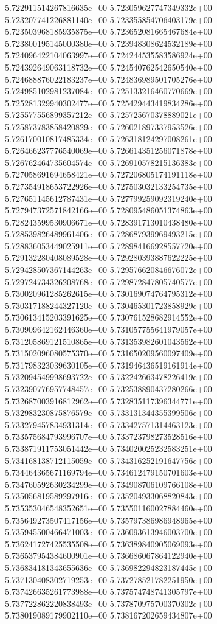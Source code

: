 5.722911514267816635e+00
5.723059627747349332e+00
5.723207741226881140e+00
5.723355854706403179e+00
5.723503968185935875e+00
5.723652081665467684e+00
5.723800195145000380e+00
5.723948308624532189e+00
5.724096422104063997e+00
5.724244535583586924e+00
5.724392649063118732e+00
5.724540762542650540e+00
5.724688876022183237e+00
5.724836989501705276e+00
5.724985102981237084e+00
5.725133216460770669e+00
5.725281329940302477e+00
5.725429443419834286e+00
5.725577556899357212e+00
5.725725670378889021e+00
5.725873783858420829e+00
5.726021897337953526e+00
5.726170010817485334e+00
5.726318124297008261e+00
5.726466237776540069e+00
5.726614351256071878e+00
5.726762464735604574e+00
5.726910578215136383e+00
5.727058691694658421e+00
5.727206805174191118e+00
5.727354918653722926e+00
5.727503032133254735e+00
5.727651145612787431e+00
5.727799259092319240e+00
5.727947372571842166e+00
5.728095486051374863e+00
5.728243599530906671e+00
5.728391713010438480e+00
5.728539826489961406e+00
5.728687939969493215e+00
5.728836053449025911e+00
5.728984166928557720e+00
5.729132280408089528e+00
5.729280393887622225e+00
5.729428507367144263e+00
5.729576620846676072e+00
5.729724734326208768e+00
5.729872847805740577e+00
5.730020961285262615e+00
5.730169074764795312e+00
5.730317188244327120e+00
5.730465301723858929e+00
5.730613415203391625e+00
5.730761528682914552e+00
5.730909642162446360e+00
5.731057755641979057e+00
5.731205869121510865e+00
5.731353982601043562e+00
5.731502096080575370e+00
5.731650209560097409e+00
5.731798323039630105e+00
5.731946436519161914e+00
5.732094549998693722e+00
5.732242663478226419e+00
5.732390776957748457e+00
5.732538890437280266e+00
5.732687003916812962e+00
5.732835117396344771e+00
5.732983230875876579e+00
5.733131344355399506e+00
5.733279457834931314e+00
5.733427571314463123e+00
5.733575684793996707e+00
5.733723798273528516e+00
5.733871911753051442e+00
5.734020025232583251e+00
5.734168138712115059e+00
5.734316252191647756e+00
5.734464365671169794e+00
5.734612479150701603e+00
5.734760592630234299e+00
5.734908706109766108e+00
5.735056819589297916e+00
5.735204933068820843e+00
5.735353046548352651e+00
5.735501160027884460e+00
5.735649273507417156e+00
5.735797386986948965e+00
5.735945500466471003e+00
5.736093613946003700e+00
5.736241727425535508e+00
5.736389840905069093e+00
5.736537954384600901e+00
5.736686067864122940e+00
5.736834181343655636e+00
5.736982294823187445e+00
5.737130408302719253e+00
5.737278521782251950e+00
5.737426635261773988e+00
5.737574748741305797e+00
5.737722862220838493e+00
5.737870975700370302e+00
5.738019089179902110e+00
5.738167202659434807e+00
